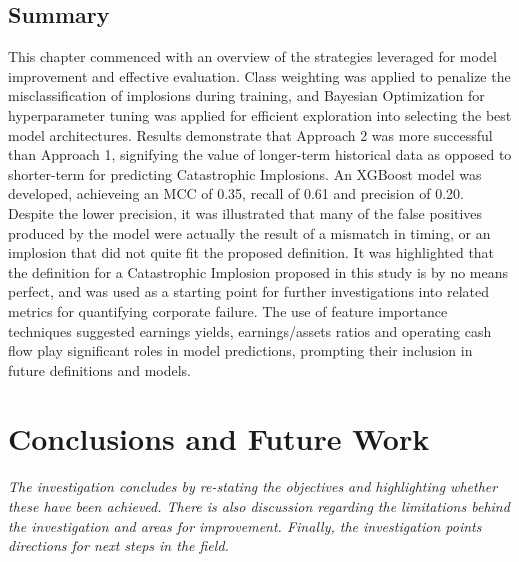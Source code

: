 \documentclass[a4paper]{report}
\begin{document}
\section{Summary}
This chapter commenced with an overview of the strategies leveraged for model improvement and effective evaluation. Class weighting was applied to penalize the misclassification 
of implosions during training, and Bayesian Optimization for hyperparameter tuning was applied for efficient exploration into selecting the best model architectures. Results demonstrate that Approach 2
was more successful than Approach 1, signifying the value of longer-term historical data as opposed to shorter-term for predicting Catastrophic Implosions. An XGBoost model was developed, achieveing
an MCC of 0.35, recall of 0.61 and precision of 0.20. Despite the lower precision, it was illustrated that many of the false positives produced by the model were actually the result of a mismatch in timing, or 
an implosion that did not quite fit the proposed definition. It was highlighted that the definition for a Catastrophic Implosion proposed in this study is by no means perfect, and was used 
as a starting point for further investigations into related metrics for quantifying corporate failure. The use of feature importance techniques suggested earnings yields, earnings/assets ratios and 
operating cash flow play significant roles in model predictions, prompting their inclusion in future definitions and models.

\chapter{Conclusions and Future Work}
\textit{The investigation concludes by re-stating the objectives and highlighting whether these have been achieved. There is also discussion regarding the limitations behind the investigation and areas
for improvement. Finally, the investigation points directions for next steps in the field.}
\end{document}
